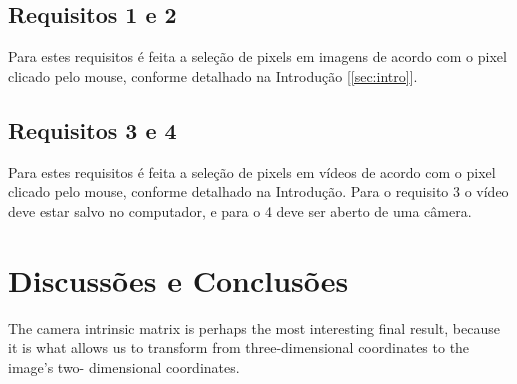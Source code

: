 \documentclass{bmvc2k}
\begin{document}
\subsection{Requisitos 1 e 2}
\label{sec:Req1e2}
Para estes requisitos é feita a seleção de pixels em imagens de acordo com o pixel clicado pelo mouse, conforme detalhado na Introdução [\ref{sec:intro}].



\subsection{Requisitos 3 e 4}
\label{sec:Req3e4}
Para estes requisitos é feita a seleção de pixels em vídeos de acordo com o pixel clicado pelo mouse, conforme detalhado na Introdução. Para o requisito 3 o vídeo deve estar salvo no computador, e para o 4 deve ser aberto de uma câmera.

\section{Discussões e Conclusões}
\label{sec:Conclusion}
The camera intrinsic matrix is perhaps the most interesting final result, because it is
what allows us to transform from three-dimensional coordinates to the image’s two-
dimensional coordinates.


\end{document}
